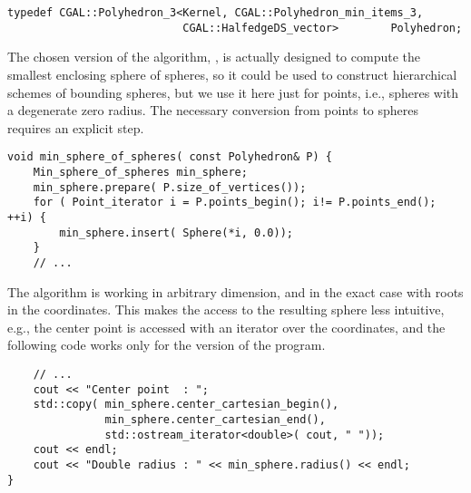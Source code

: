 \begin{lstlisting}
typedef CGAL::Polyhedron_3<Kernel, CGAL::Polyhedron_min_items_3,
                           CGAL::HalfedgeDS_vector>        Polyhedron;
\end{lstlisting}

The chosen version of the algorithm,
, is actually designed to
compute the smallest enclosing sphere of spheres, so it could be used
to construct hierarchical schemes of bounding spheres, but we use it
here just for points, i.e., spheres with a degenerate zero
radius. 
The necessary conversion from points to spheres requires an explicit step.


\begin{lstlisting}
void min_sphere_of_spheres( const Polyhedron& P) {
    Min_sphere_of_spheres min_sphere;
    min_sphere.prepare( P.size_of_vertices());
    for ( Point_iterator i = P.points_begin(); i!= P.points_end(); ++i) {
        min_sphere.insert( Sphere(*i, 0.0));
    }
    // ...
\end{lstlisting}

The algorithm is working in arbitrary dimension, and in the exact case
with roots in the coordinates. This makes
the access to the resulting sphere less intuitive, e.g., the center
point is accessed with an iterator over the coordinates, and the
following code works only for the  version of the
program.

\begin{lstlisting}
    // ...
    cout << "Center point  : ";
    std::copy( min_sphere.center_cartesian_begin(), 
               min_sphere.center_cartesian_end(),
               std::ostream_iterator<double>( cout, " "));
    cout << endl;
    cout << "Double radius : " << min_sphere.radius() << endl;
}
\end{lstlisting}


